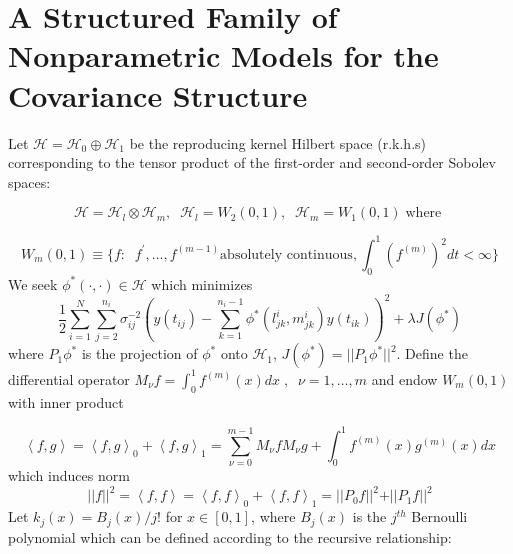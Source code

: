 \section{A Structured Family of Nonparametric Models for the Covariance Structure}


Let $\mathcal{H} = \mathcal{H}_{0} \oplus \mathcal{H}_{1}$ be the reproducing kernel Hilbert space (r.k.h.s) corresponding to the tensor product of the first-order and second-order Sobolev spaces:

\[
\mathcal{H} = \mathcal{H}_{l} \otimes \mathcal{H}_{m}, \;\; \mathcal{H}_{l} = W_2\left(0,1\right),\;\;\mathcal{H}_{m} = W_1\left(0,1\right)\;\mbox{where }
\]

\[W_m\left(0,1\right) \equiv \lbrace f: \;\;f^\prime, \dots, f^{\left( m-1 \right)} \mbox{absolutely continuous}, \int_0^1 \left(f^{\left( m \right)}\right)^2 dt < \infty \rbrace\]
\noindent
We seek $\phi^*\left(\cdot, \cdot \right) \in \mathcal{H}$ which minimizes
\begin{equation}
\frac{1}{2}\sum_{i=1}^N \sum_{j=2}^{n_i} {\sigma^{-2}_{ij}}\left( y\left(t_{ij}\right) - \sum_{k=1}^{n_i - 1}\phi^*\left(l^i_{jk},m^i_{jk} \right)y\left(t_{ik}\right) \right)^2 + \lambda J\left(\phi^*\right)  
\label{eq:objectivefun}
\end{equation}
\noindent
where $P_1 \phi^*$ is the projection of $\phi^*$ onto $\mathcal{H}_1$, $J\left(\phi^*\right) = \vert \vert P_1 \phi^* \vert \vert^2$. Define the differential operator $M_\nu f = \int_0^1 f^{\left( m \right)}\left(x\right) dx\;,\;\; \nu = 1, \dots, m$ and endow $W_m\left(0,1\right)$ with inner product

\begin{equation}
\left< f,g\right> = \left< f,g\right>_0 + \left< f,g\right>_1 = \sum_{\nu=0}^{m-1} M_\nu f M_\nu g + \int_0^1 f^{\left( m \right)}\left(x\right)g^{\left( m \right)}\left(x\right)dx
\end{equation}
\noindent
which induces norm 
\[
\vert \vert f \vert \vert^2 = \left< f,f\right> = \left< f,f\right>_0 + \left< f,f\right>_1 = \vert \vert P_0 f \vert \vert^2 + \vert \vert P_1 f \vert \vert^2
\]
\noindent
Let $k_j\left(x\right) = B_j\left(x\right)/{j!}$ for $x \in \left[0,1\right]$, where $B_j\left(x\right)$ is the $j^{th}$ Bernoulli polynomial which can be defined according to the recursive relationship:

